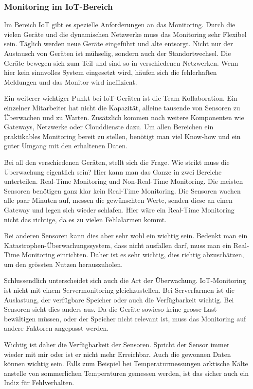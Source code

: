 \subsubsection{Monitoring im IoT-Bereich}
Im Bereich IoT gibt es spezielle Anforderungen an das Monitoring. Durch die vielen Geräte und die dynamischen Netzwerke muss das Monitoring sehr Flexibel sein. Täglich werden neue Geräte eingeführt und alte entsorgt. Nicht nur der Austausch von Geräten ist mühselig, sondern auch der Standortwechsel. Die Geräte bewegen sich zum Teil und sind so in verschiedenen Netzwerken. Wenn hier kein sinnvolles System eingesetzt wird, häufen sich die fehlerhaften Meldungen und das Monitor wird ineffizient.

Ein weiterer wichtiger Punkt bei IoT-Geräten ist die Team Kollaboration. Ein einzelner Mitarbeiter hat nicht die Kapazität, alleine tausende von Sensoren zu Überwachen und zu Warten. Zusätzlich kommen noch weitere Komponenten wie Gateways, Netzwerke oder Clouddienste dazu. Um allen Bereichen ein praktikables Monitoring bereit zu stellen, benötigt man viel Know-how und ein guter Umgang mit den erhaltenen Daten.

Bei all den verschiedenen Geräten, stellt sich die Frage. Wie strikt muss die Überwachung eigentlich sein? Hier kann man das Ganze in zwei Bereiche unterteilen. Real-Time Monitoring und Non-Real-Time Monitoring. Die meisten Sensoren benötigen ganz klar kein Real-Time Monitoring. Die Sensoren wachen alle paar Minuten auf, messen die gewünschten Werte, senden diese an einen Gateway und legen sich wieder schlafen. Hier wäre ein Real-Time Monitoring nicht das richtige, da es zu vielen Fehlalarmen kommt. 

Bei anderen Sensoren kann dies aber sehr wohl ein wichtig sein. Bedenkt man ein Katastrophen-Überwachungssystem, dass nicht ausfallen darf, muss man ein Real-Time Monitoring einrichten. Daher ist es sehr wichtig, dies richtig abzuschätzen, um den grössten Nutzen herauszuholen.

Schlussendlich unterscheidet sich auch die Art der Überwachung. IoT-Monitoring ist nicht mit einem Servermonitoring gleichzustellen. Bei Serverfarmen ist die Auslastung, der verfügbare Speicher oder auch die Verfügbarkeit wichtig. Bei Sensoren sieht dies anders aus. Da die Geräte sowieso keine grosse Last bewältigen müssen, oder der Speicher nicht relevant ist, muss das Monitoring auf andere Faktoren angepasst werden. 

Wichtig ist daher die Verfügbarkeit der Sensoren. Spricht der Sensor immer wieder mit mir oder ist er nicht mehr Erreichbar. Auch die gewonnen Daten können wichtig sein. Falls zum Beispiel bei Temperaturmessungen arktische Kälte anstelle von sommerlichen Temperaturen gemessen werden, ist das sicher auch ein Indiz für Fehlverhalten.\cite{MonTypes}

